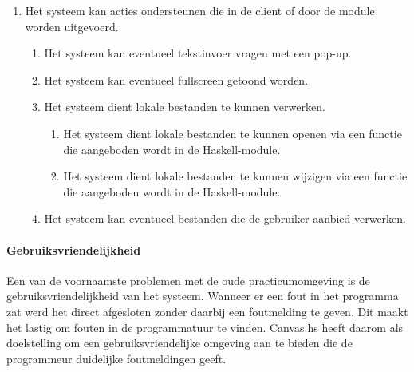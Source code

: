 \begin{enumerate}[label={R\arabic*}]
\setcounter{enumi}{\value{startvalue}}
	\item Het systeem kan acties ondersteunen die in de client of door de module worden uitgevoerd.
	\begin{enumerate}[label={R\arabic{enumi}.\arabic*}]
		\item \label{req:action:prompt} Het systeem kan eventueel tekstinvoer vragen met een pop-up.
		\item \label{req:action:fullscreen} Het systeem kan eventueel fullscreen getoond worden.
		\item \label{req:action:localfiles} Het systeem dient lokale bestanden te kunnen verwerken.
		\begin{enumerate}[label={R\arabic{enumi}.\arabic{enumii}.\arabic*}]
			\item Het systeem dient lokale bestanden te kunnen openen via een functie die aangeboden wordt in de Haskell-module.
			\item Het systeem dient lokale bestanden te kunnen wijzigen via een functie die aangeboden wordt in de Haskell-module.
		\end{enumerate}
		
		\item \label{req:action:userfiles} Het systeem kan eventueel bestanden die de gebruiker aanbied verwerken.
	\end{enumerate}
	\setcounter{startvalue}{\value{enumi}}
\end{enumerate}

\paragraph{Gebruiksvriendelijkheid} Een van de voornaamste problemen met de oude practicumomgeving is de gebruiksvriendelijkheid van het systeem. Wanneer er een fout in het programma zat werd het direct afgesloten zonder daarbij een foutmelding te geven. Dit maakt het lastig om fouten in de programmatuur te vinden. Canvas.hs heeft daarom als doelstelling om een gebruiksvriendelijke omgeving aan te bieden die de programmeur duidelijke foutmeldingen geeft.

